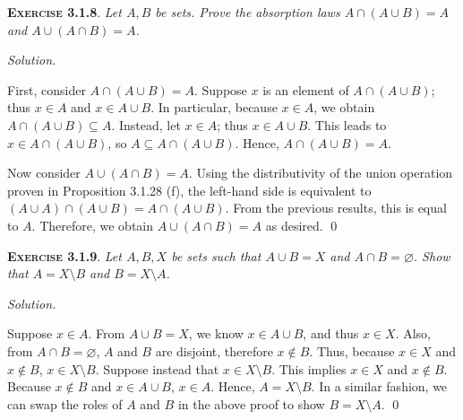 \documentclass[12pt]{article}
\theoremstyle{remark}
\newenvironment{exer}[2]{
    \noindent \setlength{\parskip}{1em}%
    \textsc{\textbf{Exercise #1}}. \textit{#2} \par
    \noindent \textit{Solution.} %
}{\bigskip}
\begin{document}
\begin{exer}{3.1.8}{
    Let $A, B$ be sets.
    Prove the \emph{absorption laws} $A \cap (A \cup B) = A$ and $A \cup (A \cap B) = A$.
}
    First, consider $A \cap (A \cup B) = A$.
    Suppose $x$ is an element of $A \cap (A \cup B)$; thus $x \in A$ and $x \in A \cup B$.
    In particular, because $x \in A$, we obtain $A \cap (A \cup B) \subseteq A$.
    Instead, let $x \in A$; thus $x \in A \cup B$.
    This leads to $x \in A \cap (A \cup B)$, so $A \subseteq A \cap (A \cup B)$.
    Hence, $A \cap (A \cup B) = A$.

    Now consider $A \cup (A \cap B) = A$.
    Using the distributivity of the union operation proven in Proposition 3.1.28 (f), the left-hand side is equivalent to $(A \cup A) \cap (A \cup B) = A \cap (A \cup B)$.
    From the previous results, this is equal to $A$.
    Therefore, we obtain $A \cup (A \cap B) = A$ as desired. \qed    
\end{exer}


\begin{exer}{3.1.9}{
    Let $A, B, X$ be sets such that $A \cup B = X$ and $A \cap B = \varnothing$.
    Show that $A = X \setminus B$ and $B = X \setminus A$.
}
    Suppose $x \in A$.
    From $A \cup B = X$, we know $x \in A \cup B$, and thus $x \in X$.
    Also, from $A \cap B = \varnothing$, $A$ and $B$ are disjoint, therefore $x \notin B$.
    Thus, because $x \in X$ and $x \notin B$, $x \in X \setminus B$.
    Suppose instead that $x \in X \setminus B$.
    This implies $x \in X$ and $x \notin B$.
    Because $x \notin B$ and $x \in A \cup B$, $x \in A$.
    Hence, $A = X \setminus B$.
    In a similar fashion, we can swap the roles of $A$ and $B$ in the above proof to show $B = X \setminus A$. \qed
\end{exer}
\end{document}
